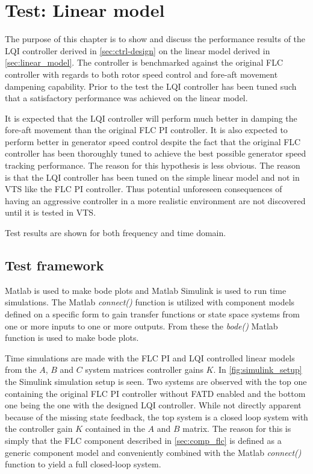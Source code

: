 \section{Test: Linear model}
The purpose of this chapter is to show and discuss the performance results of the LQI controller derived in \cref{sec:ctrl-design} on the linear model derived in \cref{sec:linear_model}. The controller is benchmarked against the original FLC controller with regards to both rotor speed control and fore-aft movement dampening capability. Prior to the test the LQI controller has been tuned such that a satisfactory performance was achieved on the linear model. 

It is expected that the LQI controller will perform much better in damping the fore-aft movement than the original FLC PI controller. It is also expected to perform better in generator speed control despite the fact that the original FLC controller has been thoroughly tuned to achieve the best possible generator speed tracking performance. The reason for this hypothesis is less obvious. The reason is that the LQI controller has been tuned on the simple linear model and not in VTS like the FLC PI controller. Thus potential unforeseen consequences of having an aggressive controller in a more realistic environment are not discovered until it is tested in VTS.

Test results are shown for both frequency and time domain.


\subsection{Test framework}
Matlab is used to make bode plots and Matlab Simulink is used to run time simulations. The Matlab \textit{connect()} function is utilized with component models defined on a specific form to gain transfer functions or state space systems from one or more inputs to one or more outputs. From these the \textit{bode()} Matlab function is used to make bode plots. 

Time simulations are made with the FLC PI and LQI controlled linear models from the $ A $, $ B $ and $ C $ system matrices controller gains $ K $. In \cref{fig:simulink_setup} the Simulink simulation setup is seen. Two systems are observed with the top one containing the original FLC PI controller without FATD enabled and the bottom one being the one with the designed LQI controller. While not directly apparent because of the missing state feedback, the top system is a closed loop system with the controller gain $ K $ contained in the $ A $ and $ B $ matrix. The reason for this is simply that the FLC component described in \cref{sec:comp_flc} is defined as a generic component model and conveniently combined with the Matlab \textit{connect()} function to yield a full closed-loop system. 

